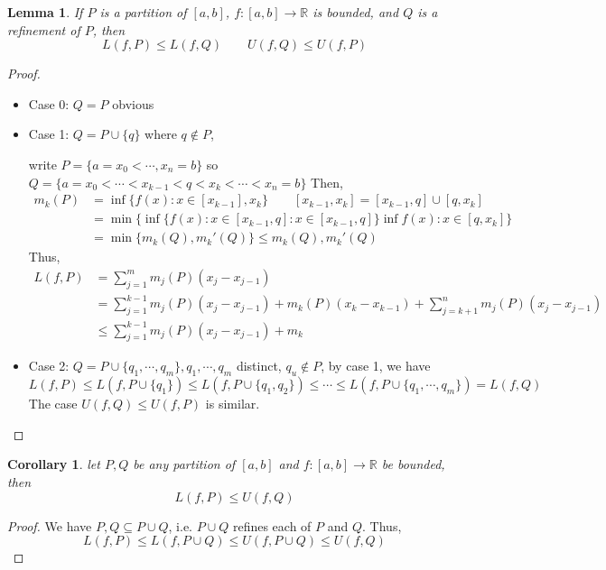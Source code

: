 \documentclass[12pt]{article}
\theoremstyle{plain}
\newtheorem{lemma}{Lemma}[subsection]
\newtheorem{corollary}{Corollary}[subsection]
\begin{document}
	\begin{lemma}
		If $P$ is a partition of $[a,b]$, $f:[a,b]\to \mathbb{R}$ is bounded,
		and $Q$ is a refinement of $P$, then 
		\[
			L(f,P)\leq L(f,Q) \qquad U(f,Q) \leq U(f,P)
		\]
	\end{lemma}
	\begin{proof}
		$ $
	\begin{itemize}
		\item Case 0: $Q = P$ obvious

		\item Case 1: $Q = P \cup \{q\}$ where $q\not\in P$, 

		write $ P = \{a = x_0<\cdots,x_n=b\}$ so 
		$Q = \{a=x_0<\cdots<x_{k-1}<q<x_k<\cdots<x_n=b\}$
		Then, 
		\begin{align*}
			m_k(P) &=\inf \{f(x):x\in[x_{k-1}],x_k\} 
			\qquad [x_{k-1},x_k] = [x_{k-1},q]\cup [q,x_k] \\
			&= \min\{\inf\{f(x): x\in [x_{k-1}, q]:x\in [x_{k-1},q]\}
			\inf f(x):x\in [q,x_k]\}\\
			&=\min\{m_k(Q), m_k'(Q)\} \leq m_k(Q), m_k'(Q)
		\end{align*}
		Thus, 
		\begin{align*}
			L(f,P) &=\sum_{j=1}^m m_j(P)(x_j-x_{j-1}) \\
				   &=\sum_{j=1}^{k-1} m_j(P)(x_j-x_{j-1})+m_k(P)(x_k-x_{k-1})
				   +\sum_{j=k+1}^n m_j(P)(x_j-x_{j-1}) \\
				   &\leq \sum_{j=1}^{k-1} m_j(P)(x_j-x_{j-1})+m_k
		\end{align*}
		
		\item Case 2: $Q = P\cup\{q_1, \cdots, q_m\}, q_1,\cdots,q_m$ distinct, 
		$q_u\not\in P$, by case 1, we have
		\[
			L(f,P) \leq L(f, P\cup\{q_1\})\leq L(f,P\cup\{q_1,q_2\})\leq \cdots
			\leq L(f,P\cup\{q_1,\cdots,q_m\}) = L(f,Q)
		\]
		The case $U(f,Q)\leq U(f,P)$ is similar. 
		\end{itemize}
	\end{proof}



	\begin{corollary}
		let $P, Q$ be any partition of $[a,b]$ and $f:[a,b]\to \mathbb{R}$ be 
		bounded, then 
		\[
			L(f,P)\leq U(f,Q)
		\]
	\end{corollary}
	\begin{proof}
		We have $P,Q \subseteq P\cup Q$, i.e. $P\cup Q$ refines each of $P$ and
		$Q$.
		Thus, 
		\[
			L(f,P)\leq L(f,P\cup Q) \leq U(f,P\cup Q) \leq U(f,Q) 
		\]
		
	\end{proof}
\end{document}
